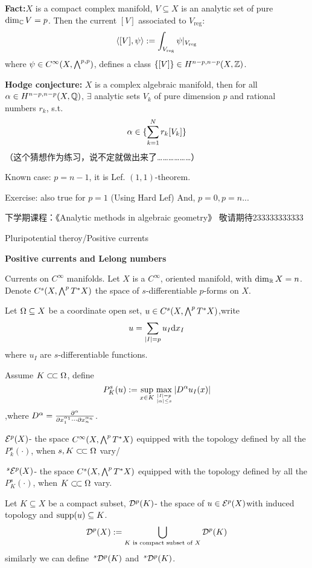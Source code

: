 \textbf{Fact:}$X$ is a compact complex manifold,
$V\subseteq X$ is an analytic set of pure
$\dim_{\mathbb{C}}V=p$. Then the current $[V]$ associated
to $V_{\text{reg}}$:
$$
  \langle [V],\psi \rangle
:=
  \int_{V_{\text{reg}}}
    \psi|_{V_{\text{reg}}}
$$
where $\psi\in C^\infty(X,\bigwedge\nolimits^{p,p})$,
defines a class
$\{[V]\}\in H^{n-p,n-p}(X,\mathbb{Z})$.

\textbf{Hodge conjecture:} $X$ is a complex algebraic manifold,
then for all $\alpha\in H^{n-p,n-p}(X,\mathbb{Q})$,
$\exists$ analytic sets $V_k$ of pure dimension $p$ and
rational numbers $r_k$, s.t.
$$
  \alpha\in
  \{\sum_{k=1}^Nr_k[V_k]\}
$$
（这个猜想作为练习，说不定就做出来了………………）

Known case: $p=n-1$, it is Lef. $(1,1)$-theorem.

Exercise: also true for $p=1$ (Using Hard Lef)
And, $p=0,p=n$...\vspp

下学期课程：《Analytic methods in algebraic geometry》
敬请期待233333333333

Pluripotential theroy/Positive currents



\textbf{Positive currents and Lelong numbers}

Currents on $C^\infty$ manifolds. Let $X$ is a $C^\infty$,
oriented manifold, with $\dim_{\mathbb{R}}X=n$.
Denote $C^s(X,\bigwedge\nolimits^{p}T^*X)$ the space
of $s$-differentiable $p$-forms on $X$.

Let $\Omega\subseteq X$ be a coordinate open set,
$u\in C^s(X,\bigwedge\nolimits^{p}T^*X)$,write 
$$u=\sum_{|I|=p} u_I\mathrm{d} x_I$$
where $u_I$ are $s$-differentiable functions.

Assume $K\subset\!\subset\Omega$, define
$$
  P^s_K(u)
:=
  \sup_{x\in K}
    \max_{|I|=p\atop|\alpha|\leq s}
      |D^\alpha u_I(x)|
$$  
,where $D^\alpha=\frac{\partial^\alpha}{\partial x_1^{\alpha_1}\cdots\partial x_n^{\alpha_n}}$.

$\mathcal{E}^p(X)$- the space $C^\infty(X,\bigwedge\nolimits^{p}T^*X)$
equipped with the topology defined by all the
$P^s_k(\cdot)$, when $s,K\subset\!\subset\Omega$ vary/

$\,^s\mathcal{E}^p(X)$- the space $C^s(X,\bigwedge\nolimits^{p}T^*X)$
equipped with the topology defined by all the
$P^s_K(\cdot)$, when $K\subset\!\subset\Omega$ vary.

Let $K\subseteq X$ be a compact subset,
$\mathcal{D}^p(K)$- the space of $u\in\mathcal{E}^p(X)$with induced topology
and $\operatorname{supp}(u)\subseteq K$.
$$\mathcal{D}^p(X):=\bigcup_{K\text{ is compact subset of $X$}}
\mathcal{D}^p(K)$$
similarly we can define $\,^s\mathcal{D}^p(K)$ and $\,^s\mathcal{D}^p(K)$.

